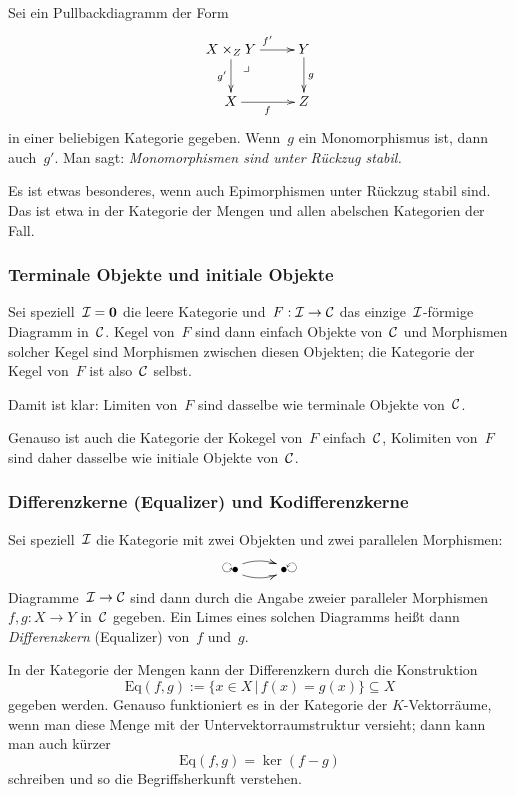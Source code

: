\begin{bsp}Sei ein Pullbackdiagramm der Form
\[ \xymatrix{
  \ar @{} [dr] |{\begin{array}{l}\lrcorner\ \ \ \ \ \ \ \ \ \\\\\end{array}}
  X \times_Z Y \ar[r]^{f'} \ar[d]_{g'} & Y \ar[d]^g \\
  X \ar[r]_f & Z
} \]
in einer beliebigen Kategorie gegeben. Wenn~$g$ ein Monomorphismus ist, dann auch~$g'$.
Man sagt: \emph{Monomorphismen sind unter Rückzug stabil.}
\end{bsp}
\begin{bem}Es ist etwas besonderes, wenn auch Epimorphismen unter Rückzug
stabil sind. Das ist etwa in der Kategorie der Mengen und allen abelschen
Kategorien der Fall.\end{bem}


\subsubsection*{Terminale Objekte und initiale Objekte}

Sei speziell~$\mathcal{I} = \mathbf{0}$ die leere Kategorie und~$F:\mathcal{I} \to \mathcal{C}$ das
einzige~$\mathcal{I}$-förmige Diagramm in~$\mathcal{C}$. Kegel von~$F$ sind dann einfach Objekte
von~$\mathcal{C}$ und Morphismen solcher Kegel sind Morphismen zwischen diesen Objekten; die
Kategorie der Kegel von~$F$ ist also~$\mathcal{C}$ selbst.

Damit ist klar: Limiten von~$F$ sind dasselbe wie terminale Objekte von~$\mathcal{C}$.

Genauso ist auch die Kategorie der Kokegel von~$F$ einfach~$\mathcal{C}$, Kolimiten
von~$F$ sind daher dasselbe wie initiale Objekte von~$\mathcal{C}$.


\subsubsection*{Differenzkerne (Equalizer) und Kodifferenzkerne}

Sei speziell~$\mathcal{I}$ die Kategorie mit zwei Objekten und zwei parallelen
Morphismen:
\[ \xymatrix{
  \reflectbox{$\bullet \rotatebox{90}{$\circlearrowright$}$}
  \ar@/^/[r] \ar@/_/[r] & \bullet
  \rotatebox{90}{$\circlearrowleft$}
} \]
Diagramme~$\mathcal{I} \to \mathcal{C}$ sind dann durch die Angabe zweier paralleler Morphismen
$f,g:X \to Y$ in~$\mathcal{C}$ gegeben. Ein Limes eines solchen Diagramms heißt dann
\emph{Differenzkern} (Equalizer) von~$f$ und~$g$.

In der Kategorie der Mengen kann der Differenzkern durch die Konstruktion
\[ \mathrm{Eq}(f,g) := \{ x \in X \,|\, f(x) = g(x) \} \subseteq X \]
gegeben werden. Genauso funktioniert es in der Kategorie der $K$-Vektorräume,
wenn man diese Menge mit der Untervektorraumstruktur versieht; dann kann man
auch kürzer
\[ \mathrm{Eq}(f,g) = \ker(f - g) \]
schreiben und so die Begriffsherkunft verstehen.

